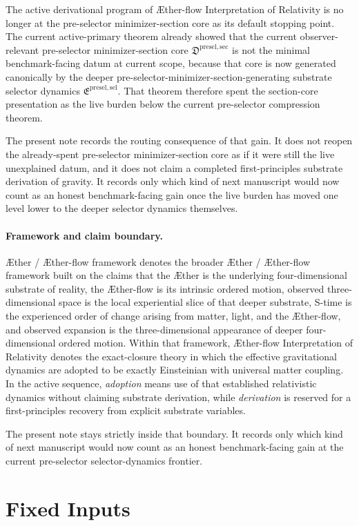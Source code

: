 \documentclass[11pt]{article}
\newcommand{\Aether}{\AE{}ther}
\newcommand{\Aflow}{\AE{}ther-flow}
\newcommand{\TheoryName}{\Aflow{} Interpretation of Relativity}
\newcommand{\TheoryProgram}{\Aether{} / \Aflow{} framework}
\newcommand{\PreSelectorMinSectionCore}{\mathfrak D^{\mathrm{presel,sec}}}
\newcommand{\PreSectionSelectorPackage}{\mathfrak E^{\mathrm{presel,sel}}}
\begin{document}
The active derivational program of \TheoryName{} is no longer at the pre-selector minimizer-section core as its default stopping point. The current active-primary theorem already showed that the current observer-relevant pre-selector minimizer-section core \(\PreSelectorMinSectionCore\) is not the minimal benchmark-facing datum at current scope, because that core is now generated canonically by the deeper pre-selector-minimizer-section-generating substrate selector dynamics \(\PreSectionSelectorPackage\). That theorem therefore spent the section-core presentation as the live burden below the current pre-selector compression theorem.

The present note records the routing consequence of that gain. It does not reopen the already-spent pre-selector minimizer-section core as if it were still the live unexplained datum, and it does not claim a completed first-principles substrate derivation of gravity. It records only which kind of next manuscript would now count as an honest benchmark-facing gain once the live burden has moved one level lower to the deeper selector dynamics themselves.

\paragraph{Framework and claim boundary.}
\TheoryProgram{} denotes the broader \Aether{} / \Aflow{} framework built on the claims that the \Aether{} is the underlying four-dimensional substrate of reality, the \Aflow{} is its intrinsic ordered motion, observed three-dimensional space is the local experiential slice of that deeper substrate, S-time is the experienced order of change arising from matter, light, and the \Aflow{}, and observed expansion is the three-dimensional appearance of deeper four-dimensional ordered motion. Within that framework, \TheoryName{} denotes the exact-closure theory in which the effective gravitational dynamics are adopted to be exactly Einsteinian with universal matter coupling. In the active sequence, \emph{adoption} means use of that established relativistic dynamics without claiming substrate derivation, while \emph{derivation} is reserved for a first-principles recovery from explicit substrate variables.

The present note stays strictly inside that boundary. It records only which kind of next manuscript would now count as an honest benchmark-facing gain at the current pre-selector selector-dynamics frontier.

\section{Fixed Inputs}
\end{document}
